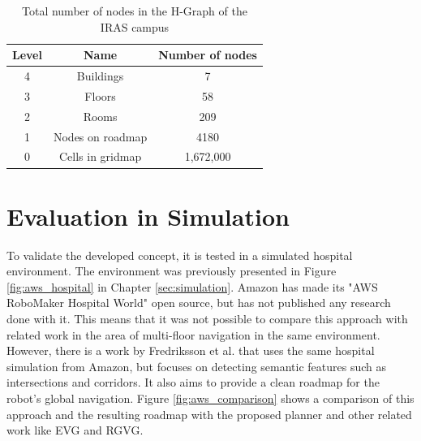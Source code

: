 \begin{table}[ht]
\centering\captionsetup{justification=centering}
\begin{tabular}{ccc}
\hline
\textbf{Level} & \textbf{Name} & \textbf{Number of nodes} \\
\hline
4 & Buildings & 7 \\
3 & Floors & 58\\
2 & Rooms & 209  \\
1 & Nodes on roadmap & 4180  \\
0 & Cells in gridmap & 1,672,000  \\
\hline
\end{tabular}
\caption{Total number of nodes in the H-Graph of the IRAS campus}
\label{tab:ltc_graph_nodes}
\end{table}

\section{Evaluation in Simulation}
\label{sec:evaluation_simulation}
To validate the developed concept, it is tested in a simulated hospital environment. The environment was previously presented in Figure \ref{fig:aws_hospital} in Chapter \ref{sec:simulation}. Amazon has made its "AWS RoboMaker Hospital World" \cite{aws_robotics_aws_2023} open source, but has not published any research done with it. This means that it was not possible to compare this approach with related work in the area of multi-floor navigation in the same environment. However, there is a work by Fredriksson et al. \cite{fredriksson_semantic_2023} that uses the same hospital simulation from Amazon, but focuses on detecting semantic features such as intersections and corridors. It also aims to provide a clean roadmap for the robot's global navigation. Figure \ref{fig:aws_comparison} shows a comparison of this approach and the resulting roadmap with the proposed planner and other related work like EVG and RGVG.

